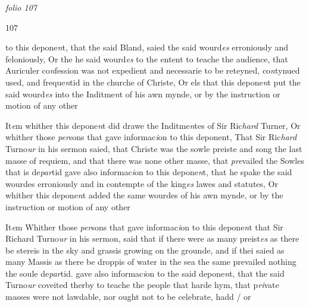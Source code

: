\documentclass[12pt, a4paper]{book}
\begin{document}
\dotfill
						\newpage
{}

\textit{folio 107}


\begin{flushright}{\color{Mahogany}107}\end{flushright}
 	
 		
		\ifthenelse{\isodd{\thepage}}
		{\reversemarginpar}
		{\normalmarginpar}
		
 			to this depone\textit{n}t, that the said Bland, saied the said wourd\textit{es}
 erroniously and feloniously, Or the he said wourd\textit{es} to the
 entent to teache the audience, that Auriculer co\textit{n}fession
 was not expedient and necessarie to be reteyned, co\textit{n}tynued
 used, and freque\textit{n}tid in the churche of Christe, Or els
 that this depone\textit{n}t put the said wourd\textit{es} into the Inditme\textit{n}t
 of his awn mynde, or by the instruction or motion of any
 other
 




				\marginpar[\vspace{0.5cm}{\textcolor{Gray}{7}}]{}
			
		\ifthenelse{\isodd{\thepage}}
		{\reversemarginpar}
		{\normalmarginpar}
		 It\textit{e}m whither this depone\textit{n}t did drawe the Inditme\textit{n}tes of Sir
 Ric\textit{hard} Turner, Or whither those \textit{per}sons that gave
	informac\textit{i}on to this deponent, That Sir Ric\textit{hard} Turno\textit{ur}
 in his sermon saied, that Christe was the sowle preiste
 and song the last masse of requiem, and that there was
 none other masse, that \textit{pre}vailed the Sowles that is de\textit{par}tid
 gave also informac\textit{i}on to this depone\textit{n}t, that he spake the said
 wourdes erroniously and in contempte of the king\textit{es} lawes
 and statutes, Or whither this depone\textit{n}t added the same
 wourdes of his awn mynde, or by the instruction or motion
 of any other
 




				\marginpar[\vspace{0.5cm}{\textcolor{Gray}{8}}]{}
			
		\ifthenelse{\isodd{\thepage}}
		{\reversemarginpar}
		{\normalmarginpar}
		 It\textit{e}m Whither those \textit{per}sons that gave informac\textit{i}on to this depone\textit{n}t
	that Sir Richard Turno\textit{ur} in his sermon, said that if
 there were as many preist\textit{es} as there be stereis in the sky
 and grassis growing on the grounde, and if thei saied
 as many Massis as there be droppis of water in the sea
 the same prevailed nothing the soule de\textit{par}tid. gave also
	informac\textit{i}on to the said depone\textit{n}t, that the said Turno\textit{ur} coveited
 therby to teache the people that harde hym, that p\textit{ri}vate masses
 were not lawdable, nor ought not to be celebrate, hadd / or
\end{document}
